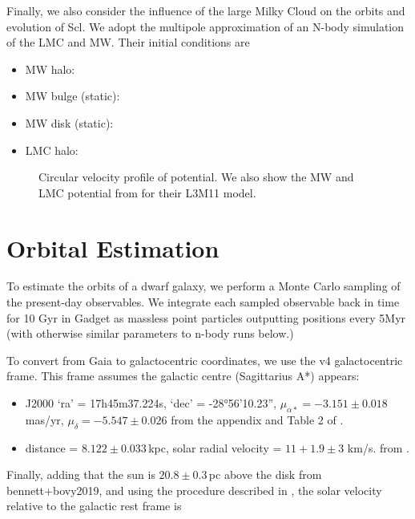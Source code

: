 Finally, we also consider the influence of the large Milky Cloud on the
orbits and evolution of Scl. We adopt the \citet{vasiliev2024} multipole
approximation of an N-body simulation of the LMC and MW. Their initial
conditions are

\begin{itemize}
\tightlist
\item
  MW halo:
\item
  MW bulge (static):
\item
  MW disk (static):
\item
  LMC halo:
\end{itemize}

\begin{figure}
\centering
{}
\caption[Circular velocity of potential]{Circular velocity profile of
\citet{EP2020} potential. We also show the MW and LMC potential from
\citet{vasiliev2024} for their L3M11 model.}\label{fig:v_circ_potential}
\end{figure}

\section{Orbital Estimation}\label{orbital-estimation}

To estimate the orbits of a dwarf galaxy, we perform a Monte Carlo
sampling of the present-day observables. We integrate each sampled
observable back in time for 10 Gyr in Gadget as massless point particles
outputting positions every 5Myr (with otherwise similar parameters to
n-body runs below.)

To convert from Gaia to galactocentric coordinates, we use the
\citet{astropy} v4 galactocentric frame. This frame assumes the galactic
centre (Sagittarius A*) appears:

\begin{itemize}
\tightlist
\item
  J2000 `ra' = 17h45m37.224s, `dec' = -28°56'10.23'',
  \(\mu_{\alpha*}=-3.151\pm0.018\) mas/yr, \(\mu_\delta=-5.547\pm0.026\)
  from the appendix and Table 2 of \citet{reid+brunthaler2004}.
\item
  distance = \(8.122\pm0.033\,\)kpc, solar radial velocity =
  \(11 + 1.9 \pm 3\) km/s. from \citet{gravitycollaboration+2018}.
\end{itemize}

Finally, adding that the sun is \(20.8\pm0.3\,\)pc above the disk from
bennett+bovy2019, and using the procedure described in
\citet{drimmel+poggio2018}, the solar velocity relative to the galactic
rest frame is

